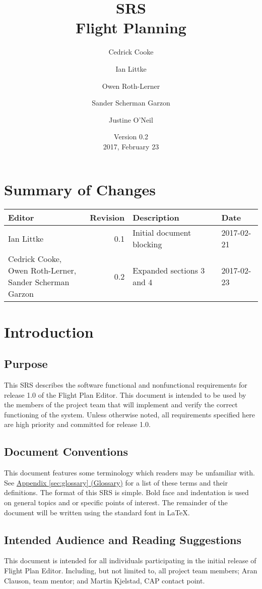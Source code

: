 \documentclass[12pt, letterpaper]{article}
\title{SRS \\
Flight Planning
}
\author{ Cedrick Cooke
    \and Ian Littke
    \and Owen Roth-Lerner
    \and Sander Scherman Garzon
    \and Justine O'Neil
}
\date{Version 0.2 \\ 2017, February 23}
\begin{document}
\maketitle

\tableofcontents
\raggedright
\section*{Summary of Changes}
\begin{tabularx}{\textwidth}{|l|r|X|l|}
\hline
Editor & Revision & Description & Date \\ \hline \hline
Ian Littke & 0.1 & Initial document blocking & 2017-02-21 \\ \hline
\makecell[cl]{Cedrick Cooke,\\ Owen Roth-Lerner,\\ Sander Scherman Garzon} & 0.2 & Expanded sections 3 and 4 & 2017-02-23 \\ \hline
\end{tabularx}

\section{Introduction}
  \subsection{Purpose}
    This SRS describes the software functional and nonfunctional requirements
    for release 1.0 of the Flight Plan Editor.
    This document is intended to be used by the members of the project team that will implement
    and verify the correct functioning of the system.
    Unless otherwise noted, all requirements specified here are high priority
    and committed for release 1.0.
  \subsection{Document Conventions}
  This document features some terminology which readers may be unfamiliar with.
  See \hyperref[sec:glossary]{Appendix \ref{sec:glossary} (Glossary)} for a list of these terms and their definitions.
  The format of this SRS is simple. Bold face and indentation is used on general topics and or specific points of interest.
  The remainder of the document will be written using the standard font in \LaTeX.
  \subsection{Intended Audience and Reading Suggestions}
  This document is intended for all individuals participating in the initial release of Flight Plan Editor.
  Including, but not limited to, all project team members; Aran Clauson, team mentor; and Martin Kjelstad, CAP contact point.
\end{document}
